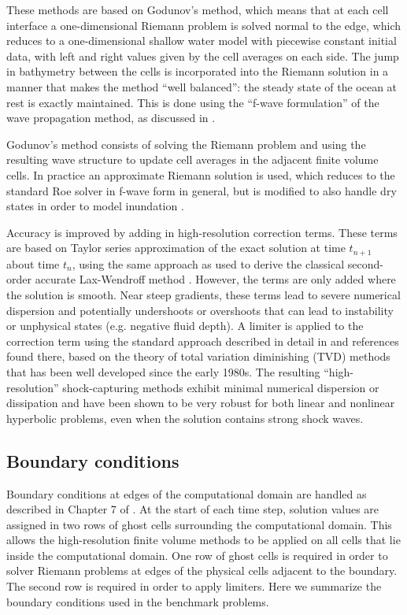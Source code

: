 These methods are based on Godunov's method, which means that at each cell
interface a one-dimensional Riemann problem is solved normal to the edge,
which reduces to a one-dimensional shallow water model with piecewise
constant initial data,
with left and right values given by the cell averages on each side.
The jump in bathymetry between the cells is incorporated into the Riemann
solution in a manner that makes the method ``well balanced'': the steady
state of the ocean at rest is exactly maintained.  This is done using the
``f-wave formulation'' of the wave propagation method, as discussed in
\cite{BaleLeVequeEtAl2002,George2008,rjl:fvmhp,rjl:wbfwave10}.


Godunov's method consists of solving the Riemann problem and using the
resulting wave structure to update cell averages in the adjacent finite
volume cells.  In practice an approximate Riemann solution is used, which
reduces to the standard Roe solver \cite{rjl:fvmhp,roe:rs}
in f-wave form in general, but is modified
to also handle dry states in order to model inundation \cite{George2008}.

Accuracy is improved by adding in high-resolution correction terms.  These
terms are based on Taylor series approximation of the exact solution at time
$t_{n+1}$ about time $t_n$, using the same approach as used to derive the
classical second-order accurate Lax-Wendroff  method \cite{rjl:fdm}.
However, the terms are only added where the solution is smooth.  Near steep
gradients, these terms lead to severe numerical dispersion and potentially
undershoots or overshoots that can lead to instability or unphysical states
(e.g. negative fluid depth).  A limiter is applied to the correction term
using the standard approach described in detail in 
\cite{rjl:fvmhp} and references found there, based on the theory of total
variation diminishing (TVD) methods that has been well developed since the
early 1980s.  The resulting ``high-resolution'' shock-capturing 
methods exhibit minimal numerical dispersion or dissipation and have been
shown to be very robust for both linear and nonlinear hyperbolic problems, 
even when the solution contains strong shock waves.

\subsection{Boundary conditions}\label{sec:bc}
Boundary conditions at edges of the computational domain are handled as
described in Chapter 7 of \cite{rjl:fvmhp}.
At the start of each time step, solution values are assigned in two
rows of ghost cells surrounding the computational domain.  This allows
the high-resolution finite volume methods to be applied on all cells
that lie inside the computational domain.  One row of ghost cells is
required in order to solver Riemann problems at edges of the physical
cells adjacent to the boundary.  The second row is required in order
to apply limiters.
Here we summarize the boundary conditions used in the benchmark
problems.  

